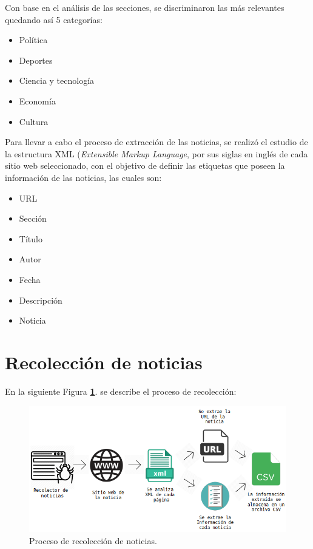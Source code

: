 Con base en el análisis de las secciones, se discriminaron las más relevantes quedando así 5 categorías: 

\begin{itemize}
    \item Política
    \item Deportes
    \item Ciencia y tecnología
    \item Economía
    \item Cultura
\end{itemize}

Para llevar a cabo el proceso de extracción de las noticias, se realizó el estudio 
de la estructura XML (\textit{Extensible Markup Language}, por sus siglas en inglés de cada sitio web seleccionado, con 
el objetivo de definir las etiquetas que poseen la información de las noticias, las cuales son:

\begin{itemize}
  \item URL
  \item Sección
  \item Título
  \item Autor
  \item Fecha
  \item Descripción
  \item Noticia
\end{itemize} 

\section{Recolección de noticias}
En la siguiente Figura \textbf{\ref{fig:diagrama}}. se describe el proceso de recolección:

\begin{figure}[H]
  \centering
  \includegraphics[scale=.50]{imagenes/Capitulo5/diagrama}
  \caption{Proceso de recolección de noticias.}
  \label{fig:diagrama}
\end{figure}

